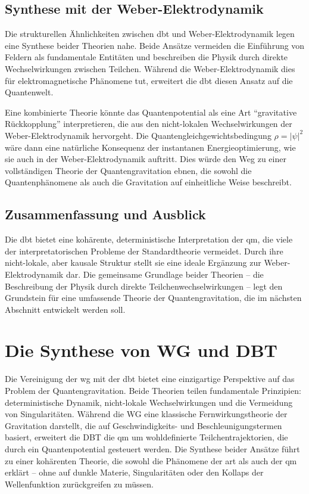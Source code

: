 \subsection{Synthese mit der Weber-Elektrodynamik}
Die strukturellen Ähnlichkeiten zwischen \gls{dbt} und Weber-Elektrodynamik legen eine Synthese beider Theorien nahe. Beide Ansätze vermeiden die Einführung von Feldern als fundamentale
Entitäten und beschreiben die Physik durch direkte Wechselwirkungen zwischen Teilchen. Während die Weber-Elektrodynamik dies für elektromagnetische Phänomene tut, erweitert die
\gls{dbt} diesen Ansatz auf die Quantenwelt.

Eine kombinierte Theorie könnte das Quantenpotential als eine Art \enquote{gravitative Rückkopplung} interpretieren, die aus den nicht-lokalen Wechselwirkungen der Weber-Elektrodynamik hervorgeht.
Die Quantengleichgewichtsbedingung $\rho = \lvert \psi \rvert^{2}$ wäre dann eine natürliche Konsequenz der instantanen Energieoptimierung, wie sie auch in der Weber-Elektrodynamik auftritt.
Dies würde den Weg zu einer vollständigen Theorie der Quantengravitation ebnen, die sowohl die Quantenphänomene als auch die Gravitation auf einheitliche Weise beschreibt.

\subsection{Zusammenfassung und Ausblick}
Die \gls{dbt} bietet eine kohärente, deterministische Interpretation der \gls{qm}, die viele der interpretatorischen Probleme der Standardtheorie vermeidet. Durch ihre nicht-lokale,
aber kausale Struktur stellt sie eine ideale Ergänzung zur Weber-Elektrodynamik dar. Die gemeinsame Grundlage beider Theorien – die Beschreibung der Physik
durch direkte Teilchenwechselwirkungen – legt den Grundstein für eine umfassende Theorie der Quantengravitation, die im nächsten Abschnitt entwickelt werden soll.

\section{Die Synthese von WG und DBT}
Die Vereinigung der \gls{wg} mit der \gls{dbt} bietet eine einzigartige Perspektive auf das Problem der Quantengravitation. Beide Theorien teilen fundamentale Prinzipien:
deterministische Dynamik, nicht-lokale Wechselwirkungen und die Vermeidung von Singularitäten. Während die WG eine klassische Fernwirkungstheorie der Gravitation darstellt,
die auf Geschwindigkeits- und Beschleunigungstermen basiert, erweitert die DBT die \gls{qm} um wohldefinierte Teilchentrajektorien, die durch ein Quantenpotential gesteuert
werden. Die Synthese beider Ansätze führt zu einer kohärenten Theorie, die sowohl die Phänomene der \gls{art} als auch der \gls{qm} erklärt – ohne auf dunkle Materie, Singularitäten
oder den Kollaps der Wellenfunktion zurückgreifen zu müssen.

